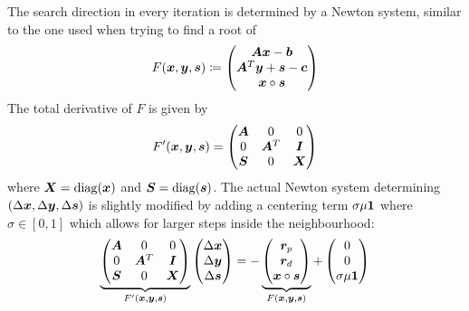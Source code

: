 The search direction in every iteration is determined by a Newton system, similar to the one used when trying to find a root of 
\begin{equation}
  F(\bm{x}, \bm{y}, \bm{s}) \coloneqq \begin{pmatrix} \bm{A}\bm{x} - \bm{b} \\ \bm{A}^T \bm{y} + \bm{s} - \bm{c} \\ \bm{x} \circ \bm{s} \end{pmatrix}
\end{equation}
The total derivative of \(F\) is given by
\begin{equation}
  F'(\bm{x}, \bm{y}, \bm{s}) = \begin{pmatrix}
    \bm{A} & 0         & 0       \\
    0       & \bm{A}^T & \bm{I} \\
    \bm{S} & 0         & \bm{X} \\
  \end{pmatrix}
\end{equation}
where \(\bm{X} = \operatorname{diag}(\bm{x})\) and \(\bm{S} = \operatorname{diag}(\bm{s})\).
The actual Newton system determining \((\Delta\bm{x}, \Delta\bm{y}, \Delta\bm{s})\) is slightly modified by adding a centering term \(\sigma \mu \bm{1}\) where \(\sigma \in [0,1]\) which allows for larger steps inside the neighbourhood:
\begin{equation}
  \underbrace{
  \begin{pmatrix}
    \bm{A} & 0         & 0       \\
    0       & \bm{A}^T & \bm{I} \\
    \bm{S} & 0         & \bm{X} \\
  \end{pmatrix}
  }_{F'(\bm{x}, \bm{y}, \bm{s})}
  \begin{pmatrix} \Delta\bm{x} \\ \Delta\bm{y} \\ \Delta\bm{s} \end{pmatrix}
  = -
  \underbrace{
  \begin{pmatrix} \bm{r}_p \\ \bm{r}_d \\ \bm{x} \circ \bm{s} \end{pmatrix}
  }_{F(\bm{x}, \bm{y}, \bm{s})}
  + \begin{pmatrix} 0 \\ 0 \\ \sigma \mu \bm{1} \end{pmatrix}
\end{equation}